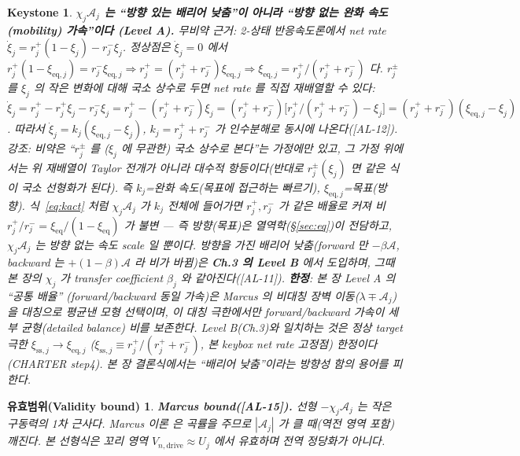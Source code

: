\documentclass[11pt,a4paper]{article}
\newtheorem*{boundbox}{유효범위(Validity bound)}
\newtheorem*{keybox}{Keystone}
\newcommand{\eq}{\mathrm{eq}}
\newcommand{\drive}{\mathrm{drive}}
\newcommand{\AL}[1]{\textsf{[AL-#1]}}
\begin{document}
\begin{keybox}
\textbf{$\chi_j\mathcal A_j$ 는 ``방향 있는 배리어 낮춤''이 아니라 ``방향 없는 완화 속도(mobility) 가속''이다
(Level A).} 무비약 근거: 2-상태 반응속도론에서 net rate $\dot\xi_j=r_j^+(1-\xi_j)-r_j^-\xi_j$. 정상점은
$\dot\xi_j=0$ 에서 $r_j^+(1-\xi_{\eq,j})=r_j^-\xi_{\eq,j}\Rightarrow r_j^+=(r_j^++r_j^-)\xi_{\eq,j}
\Rightarrow\xi_{\eq,j}=r_j^+/(r_j^++r_j^-)$ 다. $r_j^\pm$ 를 $\xi_j$ 의 작은 변화에 대해 국소 상수로 두면
net rate 를 직접 재배열할 수 있다: $\dot\xi_j=r_j^+-r_j^+\xi_j-r_j^-\xi_j=r_j^+-(r_j^++r_j^-)\xi_j
=(r_j^++r_j^-)\big[r_j^+/(r_j^++r_j^-)-\xi_j\big]=(r_j^++r_j^-)(\xi_{\eq,j}-\xi_j)$. 따라서
$\dot\xi_j=k_j(\xi_{\eq,j}-\xi_j)$, $k_j=r_j^++r_j^-$ 가 인수분해로 동시에 나온다(\AL{12}). \emph{강조}: 비약은
``$r_j^\pm$ 를 ($\xi_j$ 에 무관한) 국소 상수로 본다''는 \emph{가정}에만 있고, 그 가정 위에서는 위 재배열이 Taylor
전개가 아니라 대수적 항등이다(반대로 $r_j^\pm(\xi_j)$ 면 같은 식이 국소 선형화가 된다). 즉 $k_j$=완화 속도(목표에 접근하는 빠르기),
$\xi_{\eq,j}$=목표(방향). 식~\eqref{eq:kact} 처럼 $\chi_j\mathcal A_j$ 가 \emph{$k_j$
전체}에 들어가면 $r_j^+,r_j^-$ 가 같은 배율로 커져 비 $r_j^+/r_j^-=\xi_\eq/(1-\xi_\eq)$ 가 \emph{불변}
— 즉 방향(목표)은 열역학(\S\ref{sec:eq})이 전담하고, $\chi_j\mathcal A_j$ 는 방향 없는 속도 scale 일 뿐이다.
\emph{방향을 가진} 배리어 낮춤(forward 만 $-\beta\mathcal A$,
backward 는 $+(1-\beta)\mathcal A$ 라 비가 바뀜)은 \textbf{Ch.3 의 Level B} 에서 도입하며, 그때 본 장의
$\chi_j$ 가 transfer coefficient $\beta_j$ 와 같아진다(\AL{11}). \textbf{한정}: 본 장 Level A 의 ``공통 배율''
(forward/backward 동일 가속)은 Marcus 의 \emph{비대칭} 장벽 이동($\lambda\mp\mathcal A_j$)을 대칭으로 평균낸
\emph{모형 선택}이며, 이 대칭 극한에서만 forward/backward 가속이 세부 균형(detailed balance) 비를 보존한다. Level B(Ch.3)와
일치하는 것은 \emph{정상 target 극한} $\xi_{\mathrm{ss},j}\to\xi_{\eq,j}$ ($\xi_{\mathrm{ss},j}\equiv r_j^+/(r_j^++r_j^-)$, 본 keybox net rate 고정점) 한정이다(CHARTER step4). 본 장
결론식에서는 ``배리어 낮춤''이라는 방향성 함의 용어를 피한다.
\end{keybox}
\begin{boundbox}
\textbf{Marcus bound(\AL{15}).} 선형 $-\chi_j\mathcal A_j$ 는 작은 구동력의 1차 근사다. Marcus 이론
\cite{marcus1956} 은 곡률을 주므로 $|\mathcal A_j|$ 가 클 때(역전 영역 포함) 깨진다. 본 선형식은 꼬리 영역
$V_{n,\drive}\approx U_j$ 에서 유효하며 전역 정당화가 아니다.
\end{boundbox}
\end{document}
